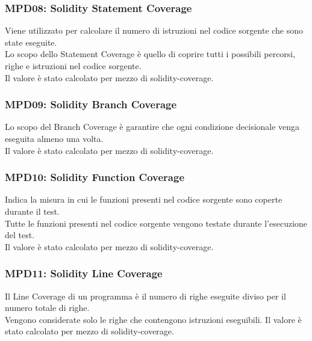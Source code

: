 \subsubsection{MPD08: Solidity Statement Coverage}
Viene utilizzato per calcolare il numero di istruzioni nel codice sorgente che sono state eseguite.\\
Lo scopo dello Statement Coverage è quello di coprire tutti i possibili percorsi, righe e istruzioni nel codice sorgente.\\
Il valore è stato calcolato per mezzo di solidity-coverage.

\subsubsection{MPD09: Solidity Branch Coverage}
Lo scopo del Branch Coverage è garantire che ogni condizione decisionale venga eseguita almeno una volta.\\
Il valore è stato calcolato per mezzo di solidity-coverage.

\subsubsection{MPD10: Solidity Function Coverage}
Indica la misura in cui le funzioni presenti nel codice sorgente sono coperte durante il test.\\
Tutte le funzioni presenti nel codice sorgente vengono testate durante l'esecuzione del test.\\
Il valore è stato calcolato per mezzo di solidity-coverage.

\subsubsection{MPD11: Solidity Line Coverage}
Il Line Coverage di un programma è il numero di righe eseguite diviso per il numero totale di righe.\\
Vengono considerate solo le righe che contengono istruzioni eseguibili.
Il valore è stato calcolato per mezzo di solidity-coverage.
